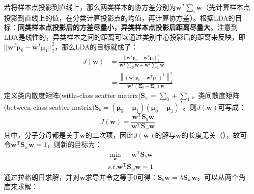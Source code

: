 若将样本点投影到直线上，那么两类样本的协方差分别为$\boldsymbol{w}^T \boldsymbol{\sum_i} \boldsymbol{w}$（先计算样本点投影到直线上的值，在分类计算投影点的均值，再计算协方差）。根据LDA的目标：\textbf{同类样本点投影后的方差尽量小，异类样本点投影后距离尽量大}。注意到LDA是线性的，异类样本之间的距离可以通过类别中心投影后的距离来反映，即$||\boldsymbol{w}^T\boldsymbol{\mu}_0 - \boldsymbol{w}^T\boldsymbol{\mu}_1||_2^2$，那么LDA的目标就成了：
\begin{align}
	J(\boldsymbol{w}) &= \frac{||\boldsymbol{w}^T\boldsymbol{\mu}_0 - \boldsymbol{w}^T\boldsymbol{\mu}_1||_2^2}{\boldsymbol{w}^T \boldsymbol{\sum_0} \boldsymbol{w} + \boldsymbol{w}^T \boldsymbol{\sum_1} \boldsymbol{w}} \nonumber \\
	&= \frac{\left\|\left(\boldsymbol{w}^{\mathrm{T}} \boldsymbol{\mu}_{0}-\boldsymbol{w}^{\mathrm{T}} \boldsymbol{\mu}_{1}\right)^{\mathrm{T}}\right\|_{2}^{2}}{\boldsymbol{w}^{\mathrm{T}}\left(\boldsymbol{\Sigma}_{0}+\boldsymbol{\Sigma}_{1}\right) \boldsymbol{w}} \nonumber
\end{align}
定义类内散度矩阵(withi-class scatter matrix)$\boldsymbol{S}_w = \boldsymbol{\sum}_0 + \boldsymbol{\sum}_1$，类间散度矩阵(between-class scatter matrix)$\boldsymbol{S}_b = (\boldsymbol{\mu}_0 - \boldsymbol{\mu}_1) (\boldsymbol{\mu}_0 - \boldsymbol{\mu}_1)^T$。则$J(\boldsymbol{w})$可写成：
$$
J(\boldsymbol{w}) = \frac{\boldsymbol{w}^{\mathrm{T}} \mathbf{S}_{b} \boldsymbol{w}}{\boldsymbol{w}^{\mathrm{T}} \mathbf{S}_{w} \boldsymbol{w}}
$$
其中，分子分母都是关于$\boldsymbol{w}$的二次项，因此$J(\boldsymbol{w})$的解与$\boldsymbol{w}$的长度无关（），故可令$\boldsymbol{w}^{\mathrm{T}} \mathbf{S}_{w} \boldsymbol{w} = 1$，则新的目标为：
\begin{align}
	& \mathop{min} \limits_{\boldsymbol{w}} -\boldsymbol{w}^T\boldsymbol{S}_b\boldsymbol{w} \nonumber\\
	& s.t. \boldsymbol{w}^{\mathrm{T}} \mathbf{S}_{w} \boldsymbol{w} = 1 \nonumber
\end{align}
通过拉格朗日求解，并对$\boldsymbol{w}$求导并令之等于0可得：$\mathbf{S}_{b} \boldsymbol{w}=\lambda \mathbf{S}_{w} \boldsymbol{w}$。可以从两个角度来求解：
